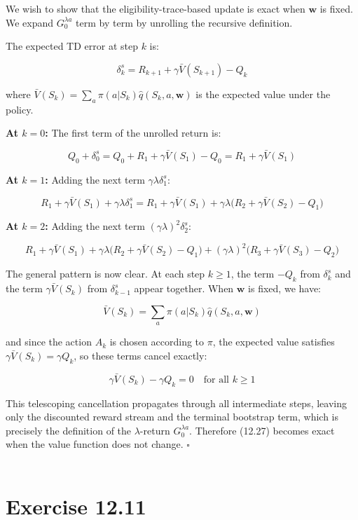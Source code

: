 \documentclass{article}
\begin{document}
We wish to show that the eligibility-trace-based update is exact when $\mathbf{w}$ is fixed. 
We expand $G_0^{\lambda a}$ term by term by unrolling the recursive definition.

The expected TD error at step $k$ is:

$$\delta_k^s = R_{k+1} + \gamma \bar{V}(S_{k+1}) - Q_k$$

where $\bar{V}(S_k) = \sum_a \pi(a|S_k)\hat{q}(S_k, a, \mathbf{w})$ is the expected value 
under the policy.

\textbf{At $k=0$:} The first term of the unrolled return is:

$$Q_0 + \delta_0^s = Q_0 + R_1 + \gamma \bar{V}(S_1) - Q_0 = R_1 + \gamma \bar{V}(S_1)$$

\textbf{At $k=1$:} Adding the next term $\gamma\lambda\delta_1^s$:

$$R_1 + \gamma \bar{V}(S_1) + \gamma\lambda\delta_1^s 
= R_1 + \gamma \bar{V}(S_1) + \gamma\lambda\bigl(R_2 + \gamma \bar{V}(S_2) - Q_1\bigr)$$

\textbf{At $k=2$:} Adding the next term $(\gamma\lambda)^2\delta_2^s$:

$$R_1 + \gamma \bar{V}(S_1) + \gamma\lambda\bigl(R_2 + \gamma \bar{V}(S_2) - Q_1\bigr) 
+ (\gamma\lambda)^2\bigl(R_3 + \gamma \bar{V}(S_3) - Q_2\bigr)$$

The general pattern is now clear. At each step $k \geq 1$, the term $-Q_k$ from 
$\delta_k^s$ and the term $\gamma \bar{V}(S_k)$ from $\delta_{k-1}^s$ appear together. 
When $\mathbf{w}$ is fixed, we have:

$$\bar{V}(S_k) = \sum_a \pi(a|S_k)\hat{q}(S_k, a, \mathbf{w})$$

and since the action $A_k$ is chosen according to $\pi$, the expected value satisfies 
$\gamma\bar{V}(S_k) = \gamma Q_k$, so these terms cancel exactly:

$$\gamma \bar{V}(S_k) - \gamma Q_k = 0 \quad \text{for all } k \geq 1$$

This telescoping cancellation propagates through all intermediate steps, leaving only 
the discounted reward stream and the terminal bootstrap term, which is precisely the 
definition of the $\lambda$-return $G_0^{\lambda a}$. Therefore (12.27) becomes exact 
when the value function does not change. \hfill$\square$
\\\\
\section*{Exercise 12.11}
\end{document}
